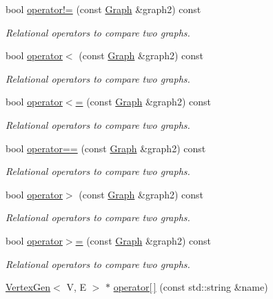 \begin{DoxyCompactItemize}
bool \mbox{\hyperlink{classGraph_aafd8d1cec3a4d6b8cdcb58016e4d093a}{operator!=}} (const \mbox{\hyperlink{classGraph}{Graph}} \&graph2) const
\begin{DoxyCompactList}\small\item\em Relational operators to compare two graphs. \end{DoxyCompactList}\item 
bool \mbox{\hyperlink{classGraph_a1daf423faecc777e29a399812dc39ca2}{operator$<$}} (const \mbox{\hyperlink{classGraph}{Graph}} \&graph2) const
\begin{DoxyCompactList}\small\item\em Relational operators to compare two graphs. \end{DoxyCompactList}\item 
bool \mbox{\hyperlink{classGraph_a352607f2b21dd87b3d2a3957bbf3da7b}{operator$<$=}} (const \mbox{\hyperlink{classGraph}{Graph}} \&graph2) const
\begin{DoxyCompactList}\small\item\em Relational operators to compare two graphs. \end{DoxyCompactList}\item 
bool \mbox{\hyperlink{classGraph_a188f85939e3fe6ed2d411f622287f722}{operator==}} (const \mbox{\hyperlink{classGraph}{Graph}} \&graph2) const
\begin{DoxyCompactList}\small\item\em Relational operators to compare two graphs. \end{DoxyCompactList}\item 
bool \mbox{\hyperlink{classGraph_a8019cf2c98949fd509193cf26ba2ff8a}{operator$>$}} (const \mbox{\hyperlink{classGraph}{Graph}} \&graph2) const
\begin{DoxyCompactList}\small\item\em Relational operators to compare two graphs. \end{DoxyCompactList}\item 
bool \mbox{\hyperlink{classGraph_ab1ca2af20f3b0251972b72295270212e}{operator$>$=}} (const \mbox{\hyperlink{classGraph}{Graph}} \&graph2) const
\begin{DoxyCompactList}\small\item\em Relational operators to compare two graphs. \end{DoxyCompactList}\item 
\mbox{\hyperlink{classVertexGen}{Vertex\+Gen}}$<$ V, E $>$ $\ast$ \mbox{\hyperlink{classBasicGraphGen_a5e874dbb2f9f2c7f98ec74f00790eb0e}{operator\mbox{[}$\,$\mbox{]}}} (const std\+::string \&name)

\end{DoxyCompactItemize}
